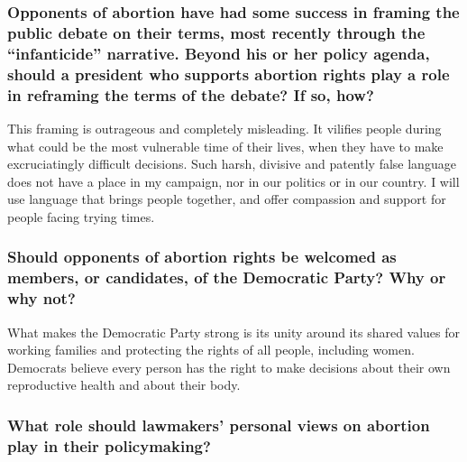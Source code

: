 \hypertarget{opponents-of-abortion-have-had-some-success-in-framing-the-public-debate-on-their-terms-most-recently-through-the-infanticide-narrative-beyond-his-or-her-policy-agenda-should-a-president-who-supports-abortion-rights-play-a-role-in-reframing-the-terms-of-the-debate-if-so-how-2}{%
\subsubsection{Opponents of abortion have had some success in framing
the public debate on their terms, most recently through the
``infanticide'' narrative. Beyond his or her policy agenda, should a
president who supports abortion rights play a role in reframing the
terms of the debate? If so,
how?}\label{opponents-of-abortion-have-had-some-success-in-framing-the-public-debate-on-their-terms-most-recently-through-the-infanticide-narrative-beyond-his-or-her-policy-agenda-should-a-president-who-supports-abortion-rights-play-a-role-in-reframing-the-terms-of-the-debate-if-so-how-2}}

This framing is outrageous and completely misleading. It vilifies people
during what could be the most vulnerable time of their lives, when they
have to make excruciatingly difficult decisions. Such harsh, divisive
and patently false language does not have a place in my campaign, nor in
our politics or in our country. I will use language that brings people
together, and offer compassion and support for people facing trying
times.

\hypertarget{should-opponents-of-abortion-rights-be-welcomed-as-members-or-candidates-of-the-democratic-party-why-or-why-not-2}{%
\subsubsection{Should opponents of abortion rights be welcomed as
members, or candidates, of the Democratic Party? Why or why
not?}\label{should-opponents-of-abortion-rights-be-welcomed-as-members-or-candidates-of-the-democratic-party-why-or-why-not-2}}

What makes the Democratic Party strong is its unity around its shared
values for working families and protecting the rights of all people,
including women. Democrats believe every person has the right to make
decisions about their own reproductive health and about their body.

\hypertarget{what-role-should-lawmakers-personal-views-on-abortion-play-in-their-policymaking-2}{%
\subsubsection{What role should lawmakers' personal views on abortion
play in their
policymaking?}\label{what-role-should-lawmakers-personal-views-on-abortion-play-in-their-policymaking-2}}

